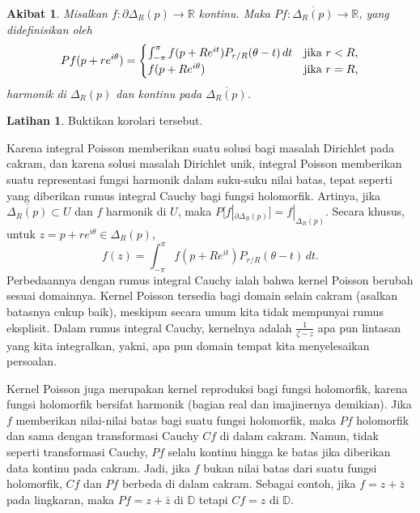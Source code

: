 \documentclass[12pt,openany]{book}
\newcommand{\avoidbreak}{\postdisplaypenalty=100}
\newcommand{\R}{{\mathbb{R}}}
\newcommand{\D}{{\mathbb{D}}}
\theoremstyle{plain}
\newtheorem{cor}[thm]{Akibat}
\theoremstyle{remark}
\theoremstyle{definition}
\newenvironment{exbox}{%
    \def\FrameCommand{\vrule width 1pt \relax\hspace{10pt}}%
    \MakeFramed{\advance\hsize-\width\FrameRestore}%
}{%
    \endMakeFramed
}
\theoremstyle{exercise}
\newtheorem{exercise}{Latihan}[section]
\theoremstyle{example}
\begin{document}
\begin{cor} \label{cor:dirichsol}
Misalkan $f \colon \partial \Delta_R(p) \to \R$ kontinu.
Maka
$Pf \colon \overline{\Delta_R(p)} \to \R$, yang didefinisikan oleh
%
\begin{equation*}
Pf(p + re^{i\theta})
=
\begin{cases}
\int_{-\pi}^\pi f(p+Re^{it}) P_{r/R}(\theta-t) \, dt
&
\text{jika $r < R$,} \\
f(p+Re^{i\theta}) & \text{jika $r=R$,}
\end{cases}
\avoidbreak
\end{equation*}
harmonik di $\Delta_R(p)$ dan kontinu pada $\overline{\Delta_R(p)}$.
\end{cor}

\begin{exbox}
\begin{exercise}
Buktikan korolari tersebut.
\end{exercise}
\end{exbox}

Karena integral Poisson memberikan suatu solusi bagi masalah Dirichlet pada cakram,
dan karena solusi masalah Dirichlet unik,
integral Poisson memberikan
suatu representasi fungsi harmonik dalam suku-suku nilai batas, tepat
seperti yang diberikan rumus integral Cauchy bagi fungsi holomorfik.
Artinya, jika $\overline{\Delta_R(p)} \subset U$ dan $f$ harmonik di $U$,
maka $P[f|_{\partial \Delta_R(p)}] = f|_{\overline{\Delta_R(p)}}$.
Secara khusus, untuk $z = p+re^{i\theta} \in \Delta_R(p)$,
\begin{equation*}
f(z) = \int_{-\pi}^\pi f(p+Re^{it}) P_{r/R}(\theta-t) \, dt .
\end{equation*}
Perbedaannya dengan rumus integral Cauchy ialah bahwa kernel Poisson
berubah sesuai domainnya. Kernel Poisson tersedia bagi
domain selain cakram (asalkan batasnya cukup baik), meskipun
secara umum kita tidak mempunyai rumus eksplisit. Dalam
rumus integral Cauchy, kernelnya adalah $\frac{1}{\zeta-z}$
apa pun lintasan yang kita integralkan, yakni, apa pun
domain tempat kita menyelesaikan persoalan.

Kernel Poisson juga merupakan kernel reproduksi bagi
fungsi holomorfik, karena fungsi holomorfik bersifat harmonik
(bagian real dan imajinernya demikian). Jika $f$ memberikan nilai-nilai batas
bagi suatu fungsi holomorfik, maka $Pf$ holomorfik dan sama dengan
transformasi Cauchy $Cf$ di dalam cakram. Namun, tidak seperti
transformasi Cauchy, $Pf$ selalu kontinu hingga ke batas jika diberikan data
kontinu pada cakram. Jadi, jika $f$ bukan nilai batas dari
suatu fungsi holomorfik, $Cf$ dan $Pf$ berbeda di dalam cakram.
Sebagai contoh, jika $f=z+\bar{z}$ pada lingkaran, maka $Pf = z+\bar{z}$ di $\D$
tetapi $Cf = z$ di $\D$.
\end{document}
